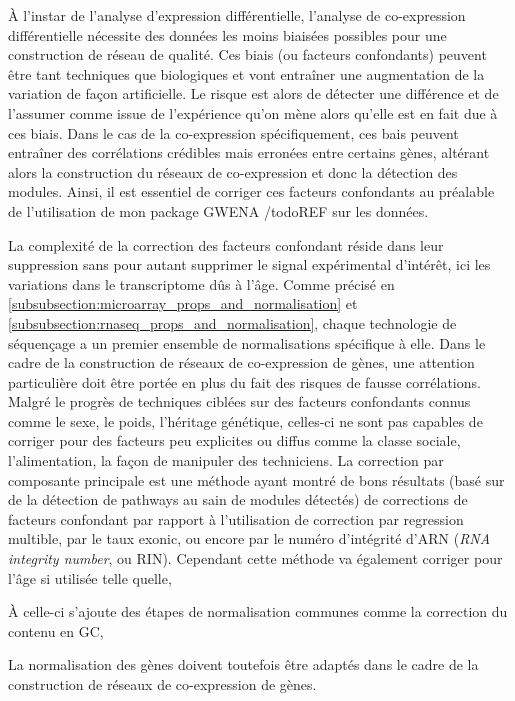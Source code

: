 À l'instar de l'analyse d'expression différentielle, l'analyse de co-expression différentielle nécessite des données les moins biaisées possibles pour une construction de réseau de qualité. Ces biais (ou facteurs confondants) peuvent être tant techniques que biologiques et vont entraîner une augmentation de la variation de façon artificielle. Le risque est alors de détecter une différence et de l'assumer comme issue de l'expérience qu'on mène alors qu'elle est en fait due à ces biais. Dans le cas de la co-expression spécifiquement, ces bais peuvent entraîner des corrélations crédibles mais erronées entre certains gènes, altérant alors la construction du réseaux de co-expression et donc la détection des modules. Ainsi, il est essentiel de corriger ces facteurs confondants au préalable de l'utilisation de mon package GWENA /todo{REF} sur les données.

La complexité de la correction des facteurs confondant réside dans leur suppression sans pour autant supprimer le signal expérimental d'intérêt, ici les variations dans le transcriptome dûs à l'âge. Comme précisé en \ref{subsubsection:microarray_props_and_normalisation} et \ref{subsubsection:rnaseq_props_and_normalisation},
chaque technologie de séquençage a un premier ensemble de normalisations spécifique à elle. Dans le cadre de la construction de réseaux de co-expression de gènes, une attention particulière doit être portée en plus du fait des risques de fausse corrélations. Malgré le progrès de techniques ciblées sur des facteurs confondants connus comme le sexe, le poids, l'héritage génétique, celles-ci ne sont pas capables de corriger pour des facteurs peu explicites ou diffus comme la classe sociale, l'alimentation, la façon de manipuler des techniciens. La correction par composante principale est une méthode ayant montré de bons résultats (basé sur de la détection de pathways au sain de modules détectés) de corrections de facteurs confondant par rapport à l'utilisation de correction par regression multible, par le taux exonic, ou encore par le numéro d'intégrité d'ARN (\textit{RNA integrity number}, ou RIN). Cependant cette méthode va également corriger pour l'âge si utilisée telle quelle,


À celle-ci s'ajoute des étapes de normalisation communes comme la correction du contenu en GC, 


La normalisation des gènes doivent toutefois être adaptés dans le cadre de la construction de réseaux de  co-expression de gènes. 



